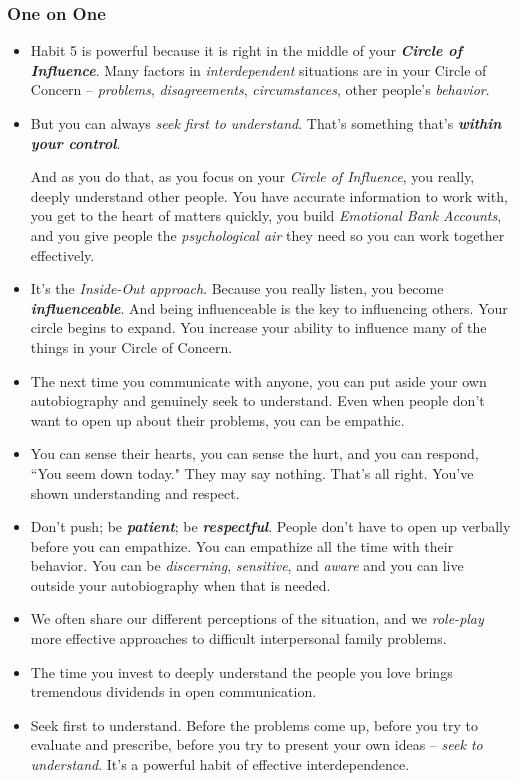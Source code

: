 \documentclass[11pt]{article}
\begin{document}
\subsubsection{One on One}
\begin{itemize}
\item Habit 5 is powerful because it is right in the middle of your \emph{\textbf{Circle of Influence}}. Many factors in \emph{interdependent} situations are in your Circle of Concern -- \emph{problems}, \emph{disagreements}, \emph{circumstances}, other people's \emph{behavior}.

\item But you can always \emph{seek first to understand}. That's something that's \emph{\textbf{within your control}}.

And as you do that, as you focus on your \emph{Circle of Influence}, you really, deeply understand other people. You have accurate information to work with, you get to the heart of matters quickly, you build \emph{Emotional Bank Accounts}, and you give people the \emph{psychological air} they need so you can work together effectively.

\item It's the \emph{Inside-Out approach}. Because you really listen, you become \emph{\textbf{influenceable}}. And being influenceable is the key to influencing
others. Your circle begins to expand. You increase your ability to influence many of the things in your Circle of Concern.

\item The next time you communicate with anyone, you can put aside your own autobiography and genuinely seek to understand. Even when people don't want to open up about their problems, you can be empathic. 

\item You can sense their hearts, you can sense the hurt, and you can respond, ``You seem down today." They may say nothing. That's all right. You've shown understanding and respect.

\item Don't push; be \emph{\textbf{patient}}; be \emph{\textbf{respectful}}. People don't have to open up verbally before you can empathize. You can empathize all the time with their behavior. You can be \emph{discerning}, \emph{sensitive}, and \emph{aware} and you can live outside your autobiography when that is needed.

\item We often share our different perceptions of the situation, and we \emph{role-play} more effective approaches to difficult interpersonal family problems.

\item The time you invest to deeply understand the people you love brings tremendous dividends in open communication. 

\item Seek first to understand. Before the problems come up, before you try to evaluate and prescribe, before you try to present your own ideas -- \emph{seek to understand}. It's a powerful habit of effective interdependence.
\end{itemize}
\end{document}
